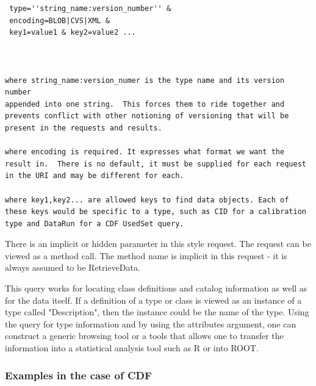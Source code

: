 \begin{verbatim}
 type=''string_name:version_number'' &
 encoding=BLOB|CVS|XML &
 key1=value1 & key2=value2 ...



where string_name:version_numer is the type name and its version number
appended into one string.  This forces them to ride together and
prevents conflict with other notioning of versioning that will be
present in the requests and results.

where encoding is required. It expresses what format we want the 
result in.  There is no default, it must be supplied for each request 
in the URI and may be different for each.

where key1,key2... are allowed keys to find data objects. Each of 
these keys would be specific to a type, such as CID for a calibration
type and DataRun for a CDF UsedSet query.
\end{verbatim}

There is an implicit or hidden parameter in this style request.
The request can be viewed as a method call.  The method name is
implicit in this request - it is always assumed to be RetrieveData.

This query works for locating class definitions and catalog information
as well as for the data itself.  If a definition of a type or class is viewed
as an instance of a type called "Description", then the instance could be
the name of the type.  Using the query for type information and 
by using the attributes argument, one can construct a generic browsing
tool or a tools that allows one to transfer the information into 
a statistical analysis tool such as R or into ROOT.

\subsubsection{Examples in the case of CDF}

